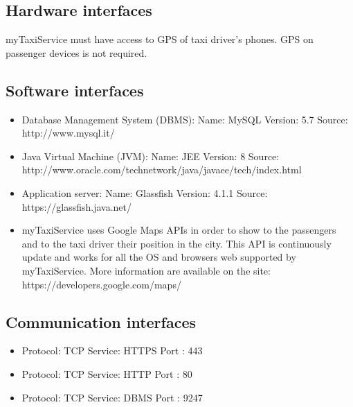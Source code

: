 \subsection{Hardware interfaces}
myTaxiService must have access to GPS of taxi driver's phones. GPS on passenger devices is not required.
\subsection{Software interfaces}
\begin{itemize}
	\item Database Management System (DBMS): \newline
	Name: MySQL \newline
	Version: 5.7 \newline
	Source: http://www.mysql.it/ 
	\item Java Virtual Machine (JVM):\newline
	Name: JEE \newline
	Version: 8 \newline
	Source: http://www.oracle.com/technetwork/java/javaee/tech/index.html
	\item Application server: \newline
	Name: Glassfish \newline
	Version: 4.1.1 \newline
	Source: https://glassfish.java.net/
	\item myTaxiService uses Google Maps APIs in order to show to the passengers and to the taxi driver their position in the city.
	This API is continuously update and works for all the OS and browsers web supported by myTaxiService.
	More information are available on the site: https://developers.google.com/maps/
\end{itemize}
\subsection{Communication interfaces}
\begin{itemize}
	\item Protocol: TCP Service: HTTPS Port : 443
	\item Protocol: TCP Service: HTTP  Port : 80
	\item Protocol: TCP Service: DBMS  Port : 9247
\end{itemize}
